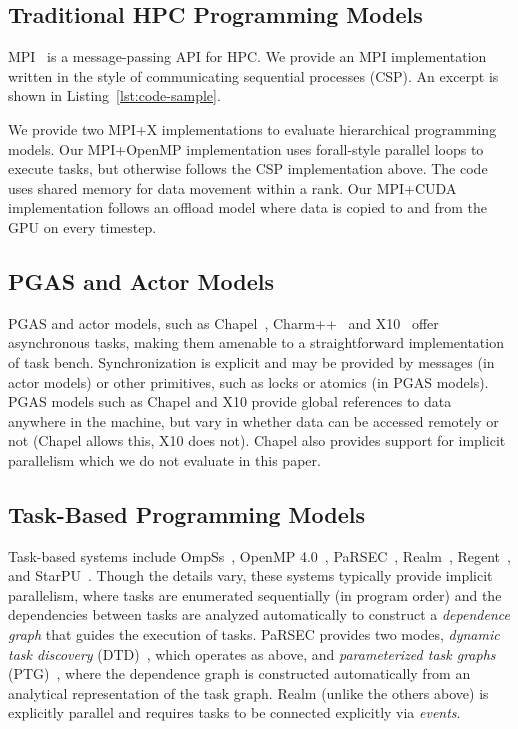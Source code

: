 \subsection{Traditional HPC Programming Models}

MPI~\cite{MPI} is a message-passing API for HPC. We provide an MPI
implementation written in the style of communicating sequential
processes (CSP). An excerpt is shown in Listing~\ref{lst:code-sample}.

We provide two MPI+X implementations to evaluate hierarchical
programming models. Our MPI+OpenMP implementation uses forall-style
parallel loops to execute tasks, but otherwise follows the CSP
implementation above. The code uses shared memory for data movement
within a rank. Our MPI+CUDA implementation follows an offload model
where data is copied to and from the GPU on every timestep.

\subsection{PGAS and Actor Models}

PGAS and actor models, such as Chapel~\cite{Chapel15},
Charm++~\cite{Charmpp93} and X10~\cite{X1005} offer
asynchronous tasks, making them amenable to a straightforward
implementation of task bench. Synchronization is explicit and may be
provided by messages (in actor models) or other primitives, such as
locks or atomics (in PGAS models). PGAS models such as Chapel and X10
provide global references to data anywhere in the machine, but vary in
whether data can be accessed remotely or not (Chapel allows this, X10
does not). Chapel also provides support for implicit parallelism which
we do not evaluate in this paper.



\subsection{Task-Based Programming Models}

Task-based systems include OmpSs~\cite{OmpSs11}, OpenMP
4.0~\cite{OpenMPSpec40}, PaRSEC~\cite{PARSEC13, PARSEC_DTD},
Realm~\cite{Realm14}, Regent~\cite{Regent15}, and
StarPU~\cite{StarPU11}. Though the details vary, these systems
typically provide implicit parallelism, where tasks are enumerated
sequentially (in program order) and the dependencies between tasks are
analyzed automatically to construct a \emph{dependence graph} that
guides the execution of tasks. PaRSEC provides two modes,
\emph{dynamic task discovery} (DTD)~\cite{PARSEC_DTD}, which operates
as above, and \emph{parameterized task graphs} (PTG)~\cite{PARSEC13},
where the dependence graph is constructed automatically from an
analytical representation of the task graph. Realm (unlike the others
above) is explicitly parallel and requires tasks to be connected
explicitly via \emph{events}.

